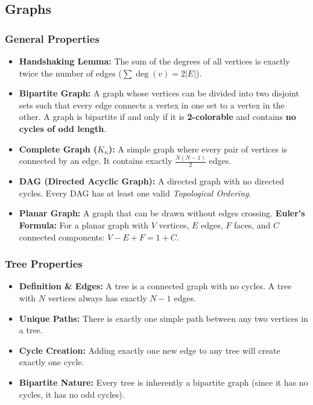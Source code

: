 \subsection{Graphs}

\subsubsection*{General Properties}
\begin{itemize}
    \item \textbf{Handshaking Lemma: } The sum of the degrees of all vertices is exactly twice the number of edges ($\sum \deg(v) = 2|E|$).
    \item \textbf{Bipartite Graph: } A graph whose vertices can be divided into two disjoint sets such that every edge connects a vertex in one set to a vertex in the other. A graph is bipartite if and only if it is \textbf{2-colorable} and contains \textbf{no cycles of odd length}.
    \item \textbf{Complete Graph ($K_n$): } A simple graph where every pair of vertices is connected by an edge. It contains exactly $\frac{N(N-1)}{2}$ edges.
    \item \textbf{DAG (Directed Acyclic Graph): } A directed graph with no directed cycles. Every DAG has at least one valid \textit{Topological Ordering}.
    \item \textbf{Planar Graph: } A graph that can be drawn without edges crossing. \textbf{Euler's Formula:} For a planar graph with $V$ vertices, $E$ edges, $F$ faces, and $C$ connected components: $V - E + F = 1 + C$.
\end{itemize}

\subsubsection*{Tree Properties}
\begin{itemize}
    \item \textbf{Definition \& Edges: } A tree is a connected graph with no cycles. A tree with $N$ vertices always has exactly $N-1$ edges.
    \item \textbf{Unique Paths: } There is exactly one simple path between any two vertices in a tree.
    \item \textbf{Cycle Creation: } Adding exactly one new edge to any tree will create exactly one cycle.
    \item \textbf{Bipartite Nature: } Every tree is inherently a bipartite graph (since it has no cycles, it has no odd cycles).
\end{itemize}

